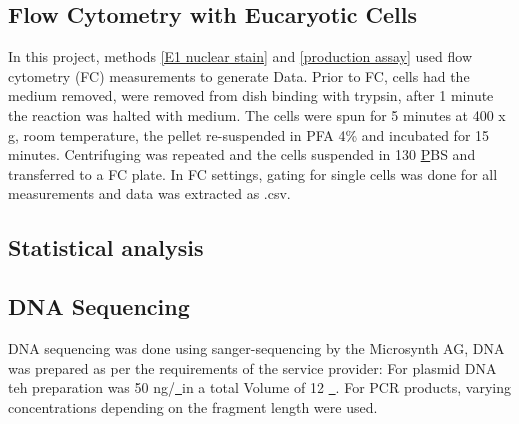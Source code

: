 \subsection{Flow Cytometry with Eucaryotic Cells}
\label{FC}
In this project, methods \ref{E1 nuclear stain} and \ref{production assay} used flow cytometry (FC) measurements to generate Data. Prior to FC, cells had the medium removed, were removed from dish binding with trypsin, after 1 minute the reaction was halted with medium. The cells were spun for 5 minutes at 400 x g, room temperature, the pellet re-suspended in PFA 4\% and incubated for 15 minutes. Centrifuging was repeated and the cells suspended in 130 \ul PBS and transferred to a FC plate. In FC settings, gating for single cells was done for all measurements and data was extracted as .csv.

\subsection{Statistical analysis}

\subsection{DNA Sequencing}

DNA sequencing was done using sanger-sequencing by the Microsynth AG, DNA was prepared as per the requirements of the service provider: For plasmid DNA teh preparation was 50 ng/\ul \ in a total Volume of 12 \ul \ . For PCR products, varying concentrations depending on the fragment length were used.



